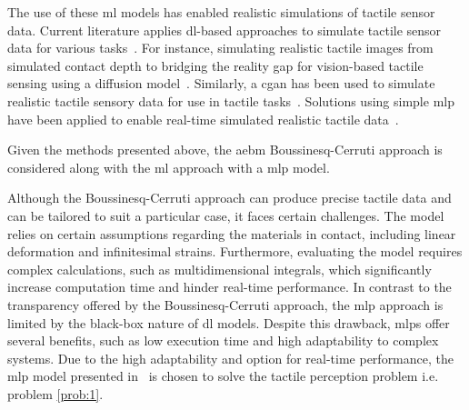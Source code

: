 The use of these \gls{ml} models has enabled realistic simulations of tactile sensor data. Current literature applies \gls{dl}-based approaches to simulate tactile sensor data for various tasks~\cite{more-than-a-feeling-learning-to-grasp-and-regrasp-using-vision-and-touch, single-grasp-object-classification-and-feature-extraction-with-simple-robot-hands-and-tactile-sensors}. For instance, simulating realistic tactile images from simulated contact depth to bridging
the reality gap for vision-based tactile sensing using a diffusion model~\cite{learning-to-read-braille:-bridging-the-tactile-reality-gap-with-diffusion-models}. Similarly, a \gls{cgan} has been used to simulate realistic tactile sensory data for use in tactile tasks~\cite{learning-to-read-braille:-bridging-the-tactile-reality-gap-with-diffusion-models}. Solutions using simple \gls{mlp} have been applied to enable real-time simulated realistic tactile data~\cite{simulation-of-the-syntouch-biotac-sensor}. \medskip

Given the methods presented above, the \gls{aebm} Boussinesq-Cerruti approach is considered along with the \gls{ml} approach with a \gls{mlp} model. \medskip

Although the Boussinesq-Cerruti approach can produce precise tactile data and can be tailored to suit a particular case, it faces certain challenges. The model relies on certain assumptions regarding the materials in contact, including linear deformation and infinitesimal strains. Furthermore, evaluating the model requires complex calculations, such as multidimensional integrals, which significantly increase computation time and hinder real-time performance. In contrast to the transparency offered by the Boussinesq-Cerruti approach, the \gls{mlp} approach is limited by the black-box nature of \gls{dl} models. Despite this drawback, \gls{mlp}s offer several benefits, such as low execution time and high adaptability to complex systems. Due to the high adaptability and option for real-time performance, the \gls{mlp} model presented in~\cite{simulation-of-the-syntouch-biotac-sensor} is chosen to solve the tactile perception problem i.e. problem \ref{prob:1}.


